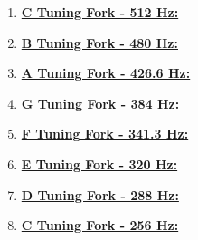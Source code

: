 \documentclass[12pt,oneside]{article}
\begin{document}
\begin{enumerate}
\item \underline{\bf C Tuning Fork - 512 Hz:}

\item \underline{\bf B Tuning Fork - 480 Hz:}

\item \underline{\bf A Tuning Fork - 426.6 Hz:}

\item \underline{\bf G Tuning Fork - 384 Hz:}

\item \underline{\bf F Tuning Fork - 341.3 Hz:}

\item \underline{\bf E Tuning Fork - 320 Hz:}

\item \underline{\bf D Tuning Fork - 288 Hz:}

\item \underline{\bf C Tuning Fork - 256 Hz:}

\end{enumerate}

\newpage
\end{document}
